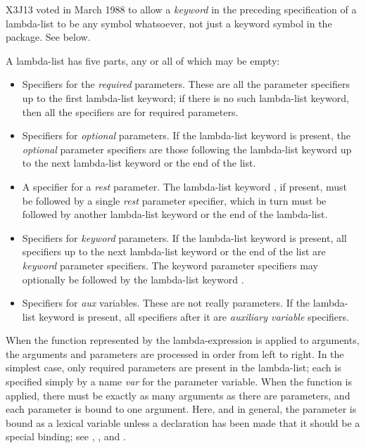 \begin{newer}
X3J13 voted in March 1988 
to allow a \emph{keyword} in the preceding specification of a lambda-list
to be any symbol whatsoever, not just a keyword symbol
in the  package.  See below.
\end{newer}

A lambda-list has five parts, any or all of which may be empty:

\begin{itemize}
\item
Specifiers for the \emph{required} parameters.  These are all the parameter
specifiers up to the first lambda-list keyword; if there is no such
lambda-list keyword, then all the specifiers are for required parameters.

\item
Specifiers for \emph{optional} parameters.
If the lambda-list keyword  is present,
the \emph{optional} parameter specifiers are those following the
lambda-list keyword  up to the next lambda-list keyword or the
end of the list.

\item
A specifier for a \emph{rest} parameter.  The lambda-list keyword , if present, must
be followed by a single \emph{rest} parameter specifier,
which in turn must be followed by another lambda-list keyword or the end
of the lambda-list.

\item
Specifiers for \emph{keyword} parameters.
If the lambda-list keyword  is present, all specifiers up to the next lambda-list keyword
or the end of the list are \emph{keyword} parameter specifiers.
The keyword parameter specifiers may optionally be followed by the
lambda-list keyword .

\item
Specifiers for \emph{aux} variables.  These are not really parameters.
If the lambda-list keyword  is present, all specifiers after it are
\emph{auxiliary variable} specifiers.
\end{itemize}

When the function represented by the lambda-expression is applied
to arguments, the arguments and parameters are processed in order
from left to right.
In the simplest case, only required parameters are present
in the lambda-list; each is specified simply by a name \emph{var} for
the parameter variable.
When the function is applied,
there must be exactly as many arguments as there are parameters,
and each parameter is bound to one argument.  Here, and in general,
the parameter is bound as a lexical variable unless a
declaration has been made that it should be a special binding;
see , , and .

